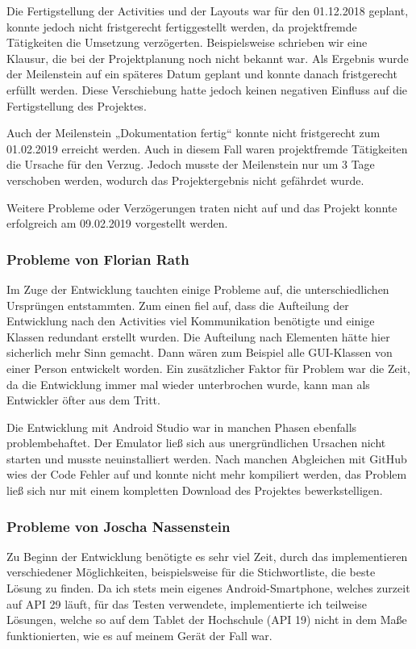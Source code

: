 Die Fertigstellung der Activities und der Layouts war für den 01.12.2018 geplant, konnte jedoch nicht fristgerecht fertiggestellt werden, da projektfremde Tätigkeiten die Umsetzung verzögerten. Beispielsweise schrieben wir eine Klausur, die bei der Projektplanung noch nicht bekannt war. Als Ergebnis wurde der Meilenstein auf ein späteres Datum geplant und konnte danach fristgerecht erfüllt werden. Diese Verschiebung hatte jedoch keinen negativen Einfluss auf die Fertigstellung des Projektes.

Auch der Meilenstein „Dokumentation fertig“ konnte nicht fristgerecht zum 01.02.2019 erreicht werden. Auch in diesem Fall waren projektfremde Tätigkeiten die Ursache für den Verzug. Jedoch musste der Meilenstein nur um 3 Tage verschoben werden, wodurch das Projektergebnis nicht gefährdet wurde.

Weitere Probleme oder Verzögerungen traten nicht auf und das Projekt konnte erfolgreich am 09.02.2019 vorgestellt werden.

\subsubsection{Probleme von Florian Rath}
Im Zuge der Entwicklung tauchten einige Probleme auf, die unterschiedlichen Ursprüngen entstammten. Zum einen fiel auf, dass die Aufteilung der Entwicklung nach den Activities viel Kommunikation benötigte und einige Klassen redundant erstellt wurden. Die Aufteilung nach Elementen hätte hier sicherlich mehr Sinn gemacht. Dann wären zum Beispiel alle GUI-Klassen von einer Person entwickelt worden. Ein zusätzlicher Faktor für Problem war die Zeit, da die Entwicklung immer mal wieder unterbrochen wurde, kann man als Entwickler öfter aus dem Tritt.

Die Entwicklung mit Android Studio war in manchen Phasen ebenfalls problembehaftet. Der Emulator ließ sich aus unergründlichen Ursachen nicht starten und musste neuinstalliert werden. Nach manchen Abgleichen mit GitHub wies der Code Fehler auf und konnte nicht mehr kompiliert werden, das Problem ließ sich nur mit einem kompletten Download des Projektes bewerkstelligen.

\subsubsection{Probleme von Joscha Nassenstein}
Zu Beginn der Entwicklung benötigte es sehr viel Zeit, durch das implementieren verschiedener Möglichkeiten, beispielsweise für die Stichwortliste, die beste Lösung zu finden. Da ich stets mein eigenes Android-Smartphone, welches zurzeit auf API 29 läuft, für das Testen verwendete, implementierte ich teilweise Lösungen, welche so auf dem Tablet der Hochschule (API 19) nicht in dem Maße funktionierten, wie es auf meinem Gerät der Fall war.

